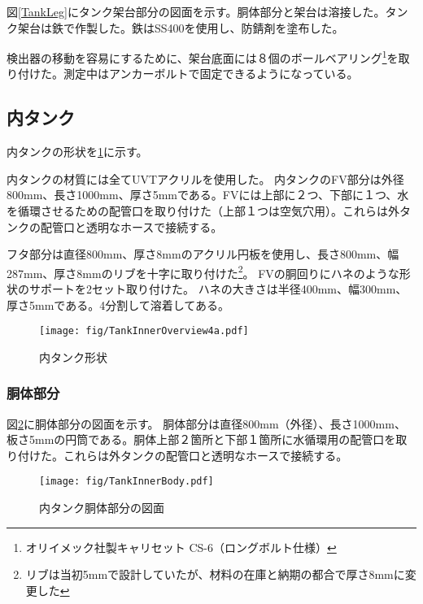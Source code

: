 \documentclass[11pt]{jreport}
\newcommand{\figref}[1]{図\ref{#1}}
\begin{document}
\figref{TankLeg}にタンク架台部分の図面を示す。胴体部分と架台は溶接した。タンク架台は鉄で作製した。鉄はSS400を使用し、防錆剤を塗布した。

検出器の移動を容易にするために、架台底面には８個のボールベアリング\footnote{オリイメック社製キャリセット CS-6（ロングボルト仕様）}を取り付けた。測定中はアンカーボルトで固定できるようになっている。


\newpage
\subsection{内タンク}
内タンクの形状を\ref{InnerTankOverview}に示す。

内タンクの材質には全てUVTアクリルを使用した。
内タンクのFV部分は外径800mm、長さ1000mm、厚さ5mmである。FVには上部に２つ、下部に１つ、水を循環させるための配管口を取り付けた（上部１つは空気穴用）。これらは外タンクの配管口と透明なホースで接続する。

フタ部分は直径800mm、厚さ8mmのアクリル円板を使用し、長さ800mm、幅287mm、厚さ8mmのリブを十字に取り付けた\footnote{リブは当初5mmで設計していたが、材料の在庫と納期の都合で厚さ8mmに変更した}。
FVの胴回りにハネのような形状のサポートを2セット取り付けた。
ハネの大きさは半径400mm、幅300mm、厚さ5mmである。4分割して溶着してある。

\begin{figure}[htbp]
\centering
\texttt{[image: fig/TankInnerOverview4a.pdf]}
\caption[内タンク形状]{内タンク形状}
\label{InnerTankOverview}
\end{figure}
\newpage
\subsubsection{胴体部分}

\figref{TankInnerBody}に胴体部分の図面を示す。
胴体部分は直径800mm（外径）、長さ1000mm、板さ5mmの円筒である。胴体上部２箇所と下部１箇所に水循環用の配管口を取り付けた。これらは外タンクの配管口と透明なホースで接続する。


\begin{figure}[htbp]
\centering
\texttt{[image: fig/TankInnerBody.pdf]}
\caption[内タンク胴体部分の図面]{内タンク胴体部分の図面}
\label{TankInnerBody}
\end{figure}
\end{document}
